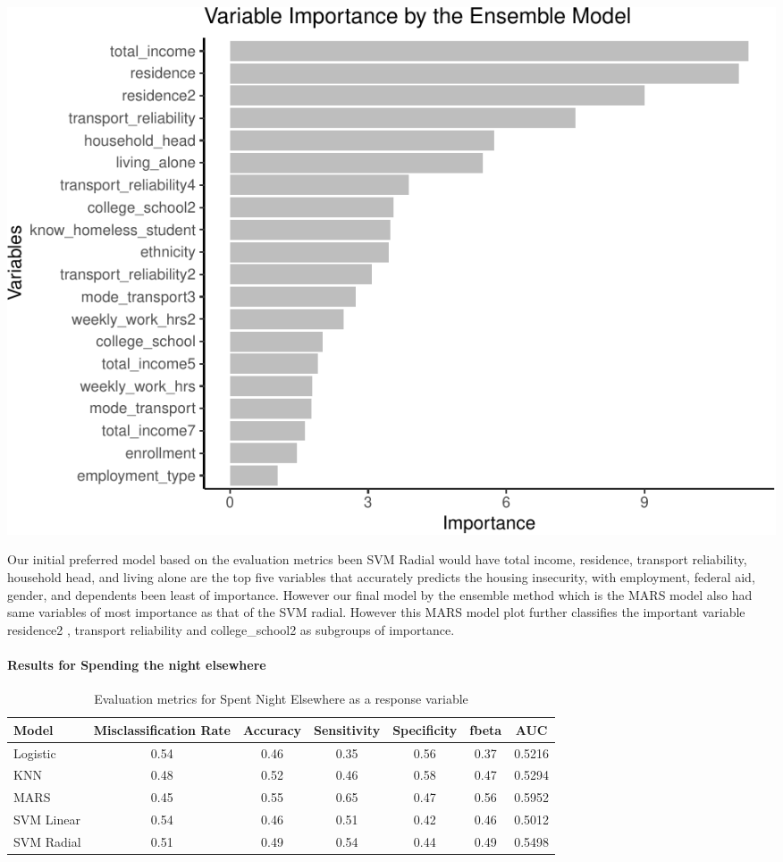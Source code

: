 \documentclass[
  10pt,
]{article}
\begin{document}
\begin{center}\includegraphics{phase2_report_files/figure-latex/unnamed-chunk-12-1} \end{center}

\hfill\break
Our initial preferred model based on the evaluation metrics been SVM Radial would have total income, residence, transport reliability, household head, and living alone are the top five variables that accurately predicts the housing insecurity, with employment, federal aid, gender, and dependents been least of importance. However our final model by the ensemble method which is the MARS model also had same variables of most importance as that of the SVM radial. However this MARS model plot further classifies the important variable residence2 , transport reliability and college\_school2 as subgroups of importance.\\

\hypertarget{results-for-spending-the-night-elsewhere}{%
\paragraph{Results for Spending the night elsewhere}\label{results-for-spending-the-night-elsewhere}}

\newline
\begin{table}[H]

\caption{\label{tab:unnamed-chunk-13}Evaluation metrics for Spent Night Elsewhere  as a response variable}
\centering
\fontsize{12}{14}\selectfont
\begin{tabular}[t]{lcccccc}
\toprule
Model & Misclassification Rate & Accuracy & Sensitivity & Specificity & fbeta & AUC\\
\midrule
Logistic & 0.54 & 0.46 & 0.35 & 0.56 & 0.37 & 0.5216\\
KNN & 0.48 & 0.52 & 0.46 & 0.58 & 0.47 & 0.5294\\
MARS & 0.45 & 0.55 & 0.65 & 0.47 & 0.56 & 0.5952\\
SVM Linear & 0.54 & 0.46 & 0.51 & 0.42 & 0.46 & 0.5012\\
SVM Radial & 0.51 & 0.49 & 0.54 & 0.44 & 0.49 & 0.5498\\
\bottomrule
\end{tabular}
\end{table}
\end{document}
